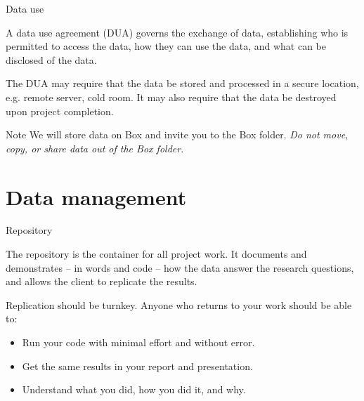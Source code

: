 \documentclass{beamer}
\begin{document}
\begin{frame}{Data use}

  A data use agreement (DUA) governs the exchange of data, establishing who is permitted to access the data, how they can use the data, and what can be disclosed of the data.

  The DUA may require that the data be stored and processed in a secure location, e.g. remote server, cold room. It may also require that the data be destroyed upon project completion.

  \begin{alertblock}{Note}
    We will store data on Box and invite you to the Box folder. \textit{Do not move, copy, or share data out of the Box folder}.
  \end{alertblock}

\end{frame}

\section{Data management}

\begin{frame}{Repository}

  The repository is the container for all project work. It documents and demonstrates -- in words and code -- how the data answer the research questions, and allows the client to replicate the results.

  Replication should be turnkey. Anyone who returns to your work should be able to:

  \begin{itemize}

    \item Run your code with minimal effort and without error.
    \item Get the same results in your report and presentation.
    \item Understand what you did, how you did it, and why.

  \end{itemize}

\end{frame}
\end{document}
